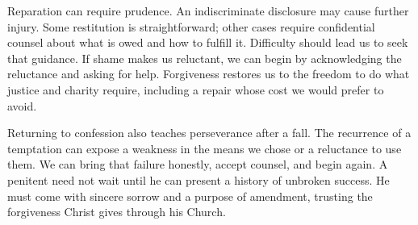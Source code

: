 Reparation can require prudence. An indiscriminate disclosure may cause further injury. Some restitution is straightforward; other cases require confidential counsel about what is owed and how to fulfill it. Difficulty should lead us to seek that guidance. If shame makes us reluctant, we can begin by acknowledging the reluctance and asking for help. Forgiveness restores us to the freedom to do what justice and charity require, including a repair whose cost we would prefer to avoid.

Returning to confession also teaches perseverance after a fall. The recurrence of a temptation can expose a weakness in the means we chose or a reluctance to use them. We can bring that failure honestly, accept counsel, and begin again. A penitent need not wait until he can present a history of unbroken success. He must come with sincere sorrow and a purpose of amendment, trusting the forgiveness Christ gives through his Church.

